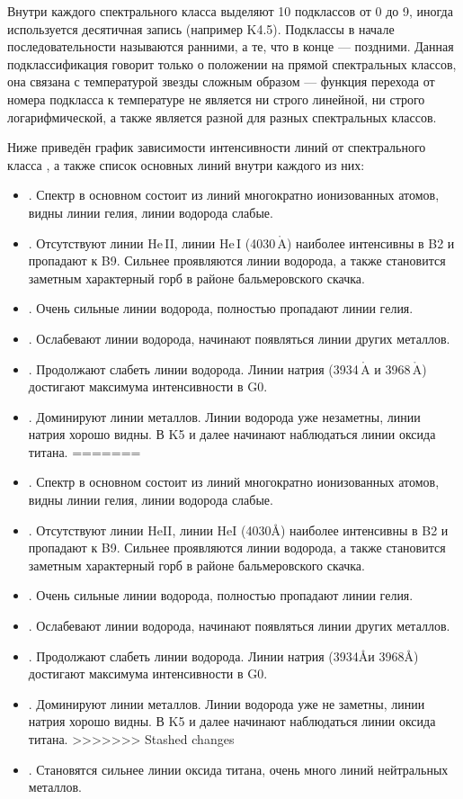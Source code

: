 Внутри каждого спектрального класса выделяют 10 подклассов от 0 до 9, иногда используется десятичная запись (например K4.5). Подклассы в начале последовательности называются ранними, а те, что в конце — поздними. Данная подклассификация говорит только о положении на прямой спектральных классов, она связана с температурой звезды сложным образом — функция перехода от номера подкласса к температуре не является ни строго линейной, ни строго логарифмической, а также является разной для разных спектральных классов.

Ниже приведён график зависимости интенсивности линий от спектрального класса , а также список основных линий внутри каждого из них:

\begin{itemize}
<<<<<<< Updated upstream
	\item {}. Спектр в основном состоит из линий  многократно ионизованных атомов, видны линии гелия, линии водорода слабые.
	\item {}. Отсутствуют линии He$\,$II, линии He$\,$I (4030$\,\mathring{\text{A}}$) наиболее интенсивны в B2 и пропадают к B9. Сильнее проявляются линии водорода, а также становится заметным характерный горб в районе бальмеровского скачка.
	\item {}. Очень сильные линии водорода, полностью пропадают линии гелия.
	\item {}. Ослабевают линии водорода, начинают появляться линии других металлов. 
	\item {}. Продолжают слабеть линии водорода. Линии натрия (3934$\,\mathring{\text{A}}$ и 3968$\,\mathring{\text{A}}$) достигают максимума интенсивности в G0.
	\item {}. Доминируют линии металлов. Линии водорода уже незаметны, линии натрия хорошо видны. В K5 и далее начинают наблюдаться линии оксида титана.
=======
	\item {}. Спектр в основном состоит из линий многократно ионизованных атомов, видны линии гелия, линии водорода слабые.
	\item {}. Отсутствуют линии HeII, линии HeI (4030\AA) наиболее интенсивны в B2 и пропадают к B9. Сильнее проявляются линии водорода, а также становится заметным характерный горб в районе бальмеровского скачка.
	\item {}. Очень сильные линии водорода, полностью пропадают линии гелия.
	\item {}. Ослабевают линии водорода, начинают появляться линии других металлов.
	\item {}. Продолжают слабеть линии водорода. Линии натрия (3934\AA и 3968\AA) достигают максимума интенсивности в G0.
	\item {}. Доминируют линии металлов. Линии водорода уже не заметны, линии натрия хорошо видны. В K5 и далее начинают наблюдаться линии оксида титана.
>>>>>>> Stashed changes
	\item {}. Становятся сильнее линии оксида титана, очень много линий нейтральных металлов.
\end{itemize}

